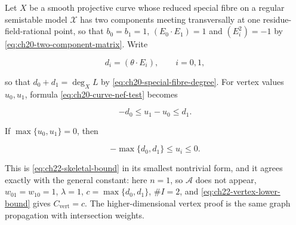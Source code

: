 \begin{example}
\label{ex:ch22-two-vertex}
Let \(X\) be a smooth projective curve whose reduced special fibre on a
regular semistable model \(\mathcal X\) has two components meeting
transversally at one residue-field-rational point, so that
\(b_0=b_1=1\), \((E_0\cdot E_1)=1\) and
\((E_i^2)=-1\) by \eqref{eq:ch20-two-component-matrix}.  Write

\[
              d_i=(\theta\cdot E_i),\qquad i=0,1,
\]

so that \(d_0+d_1=\deg_XL\) by \eqref{eq:ch20-special-fibre-degree}.  For
vertex values \(u_0,u_1\), formula
\eqref{eq:ch20-curve-nef-test} becomes

\[
                   -d_0\leq u_1-u_0\leq d_1.
\tag{22.55}\label{eq:ch22-two-vertex-bound}
\]

If \(\max\{u_0,u_1\}=0\), then

\[
                   -\max\{d_0,d_1\}\leq u_i\leq0.
\]

This is \eqref{eq:ch22-skeletal-bound} in its smallest nontrivial form, and
it agrees exactly with the general constant: here \(n=1\), so
\(\mathcal A\) does not appear, \(w_{01}=w_{10}=1\), \(\lambda=1\),
\(c=\max\{d_0,d_1\}\), \(\#I=2\), and
\eqref{eq:ch22-vertex-lower-bound} gives
\(C_{\mathrm{vert}}=c\).  The higher-dimensional vertex proof is the same
graph propagation with intersection weights.
\end{example}

